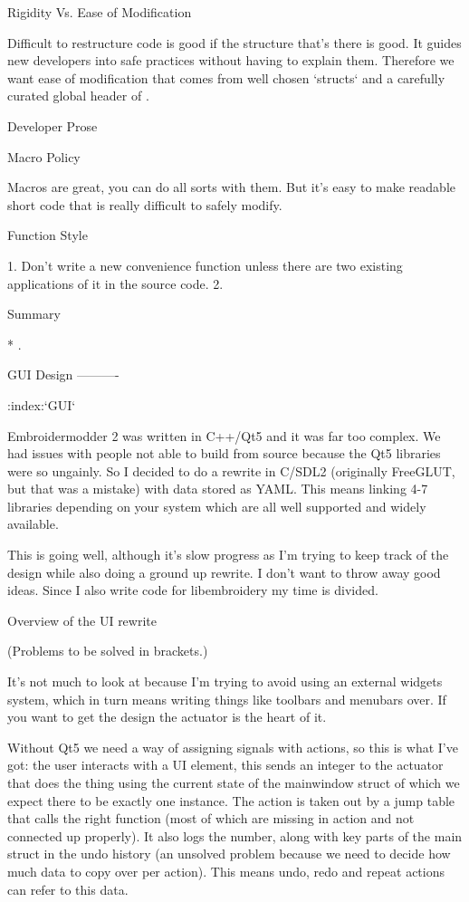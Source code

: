 \documentclass[a4paper]{report}
\begin{document}
{Rigidity Vs. Ease of Modification
~~~~~~~~~~~~~~~~~~~~~~~~~~~~~~~~~

Difficult to restructure code is good if the structure that's there is good.
It guides new developers into safe practices without having to explain them.
Therefore we want ease of modification that comes from well chosen `structs`
and a carefully curated global header of .

Developer Prose
~~~~~~~~~~~~~~~

Macro Policy
~~~~~~~~~~~~

Macros are great, you can do all sorts with them. But it's easy to make readable
short code that is really difficult to safely modify.

Function Style
~~~~~~~~~~~~~~

1. Don't write a new convenience function unless there are two
existing applications of it in the source code.
2. 

Summary
~~~~~~~

* .

GUI Design
----------

:index:`GUI`

Embroidermodder 2 was written in C++/Qt5 and it was far too complex. We had
issues with people not able to build from source because the Qt5 libraries were
so ungainly. So I decided to do a rewrite in C/SDL2 (originally FreeGLUT, but
that was a mistake) with data stored as YAML. This means linking 4-7 libraries
depending on your system which are all well supported and widely available.

This is going well, although it's slow progress as I'm trying to keep track of
the design while also doing a ground up rewrite. I don't want to throw away good
ideas. Since I also write code for libembroidery my time is divided.

Overview of the UI rewrite

(Problems to be solved in brackets.)

It's not much to look at because I'm trying to avoid using an external
widgets system, which in turn means writing things like toolbars and menubars
over. If you want to get the design the actuator is the heart of it.

Without Qt5 we need a way of assigning signals with actions, so this is what
I've got: the user interacts with a UI element, this sends an integer to the
actuator that does the thing using the current state of the mainwindow struct
of which we expect there to be exactly one instance. The action is taken out
by a jump table that calls the right function (most of which are missing in
action and not connected up properly). It also logs the number, along with
key parts of the main struct in the undo history (an unsolved problem because
we need to decide how much data to copy over per action). This means undo,
redo and repeat actions can refer to this data.

}
\end{document}
